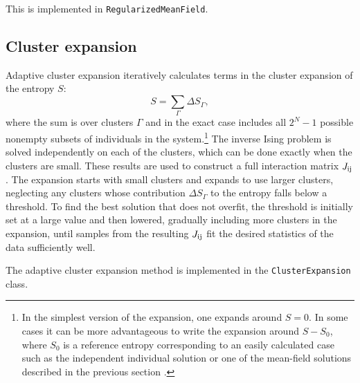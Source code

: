 \documentclass[aps,prl,twocolumn,nofootinbib]{revtex4-1}
\begin{document}
This is implemented in {\tt RegularizedMeanField}.



\subsection{Cluster expansion}

Adaptive cluster expansion \cite{Monasson:2011fo,CocMon12,BarCoc13}
iteratively calculates terms in the
cluster expansion of the entropy $S$:
\begin{equation}
S = \sum_\Gamma \Delta S_\Gamma,
\end{equation}
where the sum is over clusters $\Gamma$ and in the exact case
includes all $2^N - 1$ possible nonempty subsets of individuals in the system.\footnote{In the simplest version of the expansion,
one expands around $S=0$.  In some cases it can be more advantageous to write the
expansion around $S-S_0$, where $S_0$ is a reference entropy corresponding to
an easily calculated case such as
the independent individual solution or one of the mean-field solutions
described in the previous section \cite{BarCoc13}.}
The inverse Ising problem is solved independently
on each of the clusters, which can be done exactly when the
clusters are small.  These results are used to construct a full
interaction matrix $J_{\rm ij}$.
The expansion starts with small clusters and expands to use larger
clusters, neglecting any clusters whose
contribution $\Delta S_\Gamma$ to the entropy falls below a threshold.
To find the best solution that does not overfit,
the threshold is initially set at a large value and then lowered,
gradually including more clusters in the expansion, until samples from
the resulting $J_{\rm ij}$ fit the desired statistics of the data sufficiently well.

The adaptive cluster expansion method is implemented in the {\tt ClusterExpansion} class.


\end{document}
